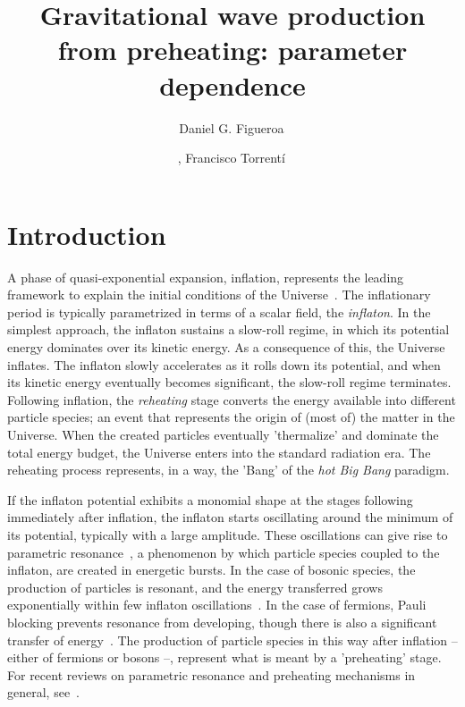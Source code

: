 \documentclass[a4paper,11pt]{article}
\title{\boldmath Gravitational wave production from preheating: parameter dependence}
\author[a]{Daniel G. Figueroa\,}
\author[b]{, Francisco Torrent\'i\,}
\affiliation[a]{\,CERN, Theory Division, 1211 Geneva, Switzerland}
\affiliation[b]{\,Instituto de F\'isica Te\'orica IFT-UAM/CSIC, Universidad Aut\'onoma de Madrid, Cantoblanco 28049 Madrid, Spain.}
\begin{document}
\maketitle
\flushbottom

\section{Introduction}

A phase of quasi-exponential expansion, inflation, represents the leading framework to explain the initial conditions of the Universe~\cite{Ade:2015lrj}. The inflationary period is typically parametrized in terms of a scalar field, the {\it inflaton}. In the simplest approach, the inflaton sustains a slow-roll regime, in which its potential energy dominates over its kinetic energy. As a consequence of this, the Universe inflates. The inflaton slowly accelerates as it rolls down its potential, and when its kinetic energy eventually becomes significant, the slow-roll regime terminates. Following inflation, the {\it reheating} stage converts the energy available into different particle species; an event that represents the origin of (most of) the matter in the Universe. When the created particles eventually 'thermalize' and dominate the total energy budget, the Universe enters into the standard radiation era. The reheating process represents, in a way, the 'Bang' of the {\it hot Big Bang} paradigm.

If the inflaton potential exhibits a monomial shape at the stages following immediately after inflation, the inflaton starts oscillating around the minimum of its potential, typically with a large amplitude. These oscillations can give rise to parametric resonance~\cite{Traschen:1990sw,Kofman:1994rk}, a phenomenon by which particle species coupled to the inflaton, are created in energetic bursts. In the case of bosonic species, the production of particles is resonant, and the energy transferred grows exponentially within few inflaton oscillations~\cite{Traschen:1990sw,Kofman:1994rk,Shtanov:1994ce,Kaiser:1995fb,Kofman:1997yn,Greene:1997fu,Kaiser:1997mp,Kaiser:1997hg}. In the case of fermions, Pauli blocking prevents resonance from developing, though there is also a significant transfer of energy~\cite{Greene:1998nh,Greene:2000ew,Peloso:2000hy,Berges:2010zv}. The production of particle species in this way after inflation -- either of fermions or bosons --, represent what is meant by a 'preheating' stage. For recent reviews on parametric resonance and preheating mechanisms in general, see~\cite{Allahverdi:2010xz,Amin:2014eta}.
\end{document}
